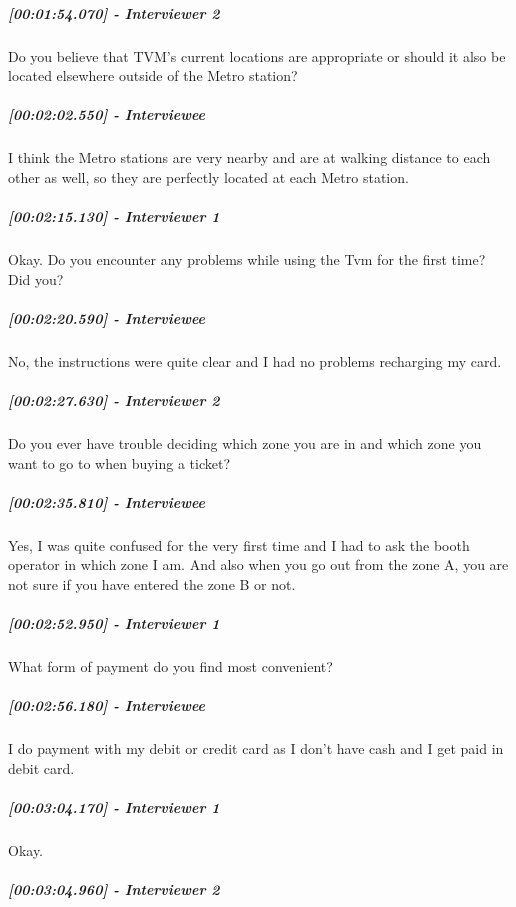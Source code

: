\documentclass[a4paper,12pt]{article}
\begin{document}
\hypertarget{interviewer-2-7}{%
\subparagraph{{[}00:01:54.070{]} - Interviewer
2}\label{interviewer-2-7}}

Do you believe that TVM's current locations are appropriate or should it
also be located elsewhere outside of the Metro station?

\hypertarget{interviewee-13}{%
\subparagraph{{[}00:02:02.550{]} - Interviewee}\label{interviewee-13}}

I think the Metro stations are very nearby and are at walking distance
to each other as well, so they are perfectly located at each Metro
station.

\hypertarget{interviewer-1-7}{%
\subparagraph{{[}00:02:15.130{]} - Interviewer
1}\label{interviewer-1-7}}

Okay. Do you encounter any problems while using the Tvm for the first
time? Did you?

\hypertarget{interviewee-14}{%
\subparagraph{{[}00:02:20.590{]} - Interviewee}\label{interviewee-14}}

No, the instructions were quite clear and I had no problems recharging
my card.

\hypertarget{interviewer-2-8}{%
\subparagraph{{[}00:02:27.630{]} - Interviewer
2}\label{interviewer-2-8}}

Do you ever have trouble deciding which zone you are in and which zone
you want to go to when buying a ticket?

\hypertarget{interviewee-15}{%
\subparagraph{{[}00:02:35.810{]} - Interviewee}\label{interviewee-15}}

Yes, I was quite confused for the very first time and I had to ask the
booth operator in which zone I am. And also when you go out from the
zone A, you are not sure if you have entered the zone B or not.

\hypertarget{interviewer-1-8}{%
\subparagraph{{[}00:02:52.950{]} - Interviewer
1}\label{interviewer-1-8}}

What form of payment do you find most convenient?

\hypertarget{interviewee-16}{%
\subparagraph{{[}00:02:56.180{]} - Interviewee}\label{interviewee-16}}

I do payment with my debit or credit card as I don't have cash and I get
paid in debit card.

\hypertarget{interviewer-1-9}{%
\subparagraph{{[}00:03:04.170{]} - Interviewer
1}\label{interviewer-1-9}}

Okay.

\hypertarget{interviewer-2-9}{%
\subparagraph{{[}00:03:04.960{]} - Interviewer
2}\label{interviewer-2-9}}
\end{document}
